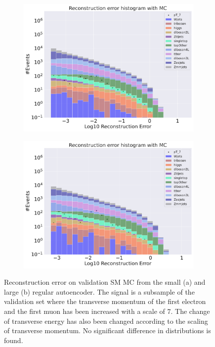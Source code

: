 \begin{figure}[H]
    \centering
    \begin{subfigure}{.45\textwidth}
        \includegraphics[width=\textwidth]{Figures/AE_testing/small/b_data_recon_big_rm3_feats_sig_pT_7.pdf}
        \caption{ }
        \label{fig:ae_small_pt_7}
    \end{subfigure}
    \hfill 
    \begin{subfigure}{.45\textwidth}
        \includegraphics[width=\textwidth]{Figures/AE_testing/big/b_data_recon_big_rm3_feats_sig_pT_7.pdf}
        \caption{ }
        \label{fig:ae_big_pt_7}
    \end{subfigure}
    \hfill 
    \caption[AE | Reconstruction error $p_T$ altering of 7]{Reconstruction error on validation SM MC from the small (a) and large (b) regular autoencoder. The signal is a subsample of the validation 
    set where the transverse momentum of the first electron and the first muon has been increased with a scale of $7$. The change of transverse 
    energy has also been changed according to the scaling of transverse momentum. No significant difference in distributions is found. }
    \label{fig:ae_big_small_pt_7}
\end{figure}


